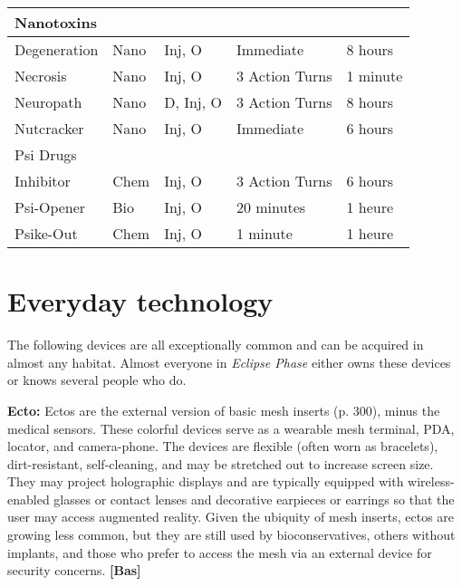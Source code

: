 {{\begin{table}
\begin{tabular}{|l|l|l|l|l|}
\multicolumn{5}{|l|}{Nanotoxins} \\ \hline

Degeneration	&Nano	&Inj, O	&Immediate	&8 hours \\ \hline

Necrosis	&Nano	&Inj, O	&3 Action Turns	&1 minute \\ \hline

Neuropath	&Nano	&D, Inj, O	&3 Action Turns	&8 hours \\ \hline

Nutcracker	&Nano	&Inj, O	&Immediate	&6 hours \\ \hline

\multicolumn{5}{|l|}{Psi Drugs} \\ \hline

Inhibitor	&Chem	&Inj, O	&3 Action Turns	&6 hours \\ \hline

Psi-Opener	&Bio	&Inj, O	&20 minutes	&1 heure \\ \hline

Psike-Out	&Chem	&Inj, O	&1 minute	&1 heure \\ \hline

\end{tabular} \label{tab:Toxins} \end{table} 



\section{Everyday technology} \label{sec:everyday-tech} 

The following devices are all exceptionally common and can be acquired in almost any habitat. Almost everyone in \emph{Eclipse Phase} either owns these devices or knows several people who do. 

\textbf{Ecto:} Ectos are the external version of basic mesh inserts (p. 300), minus the medical sensors. These colorful devices serve as a wearable mesh terminal, PDA, locator, and camera-phone. The devices are flexible (often worn as bracelets), dirt-resistant, self-cleaning, and may be stretched out to increase screen size. They may project holographic displays and are typically equipped with wireless-enabled glasses or contact lenses and decorative earpieces or earrings so that the user may access augmented reality. Given the ubiquity of mesh inserts, ectos are growing less common, but they are still used by bioconservatives, others without implants, and those who prefer to access the mesh via an external device for security concerns. \textbf{[Bas]} 

}}
